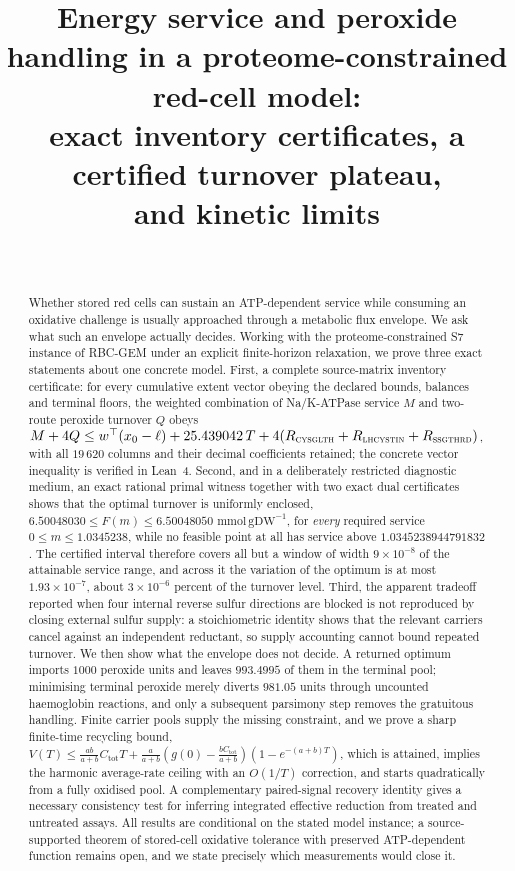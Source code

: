 \documentclass[11pt,a4paper]{article}
\title{Energy service and peroxide handling in a proteome-constrained
red-cell model:\\ exact inventory certificates, a certified turnover plateau,\\
and kinetic limits}
\author{\PaperAuthor\\[2pt] {\small\itshape \PaperAffiliation}}
\date{\PaperDate}
\theoremstyle{plain}
\theoremstyle{definition}
\theoremstyle{remark}
\newcommand{\Ctot}{C_{\mathrm{tot}}}
\newcommand{\mmolg}{\mathrm{mmol}\,\mathrm{gDW}^{-1}}
\newcommand{\rx}[1]{\textnormal{\textsc{#1}}}
\begin{document}
\maketitle

\begin{abstract}
Whether stored red cells can sustain an ATP-dependent service while consuming
an oxidative challenge is usually approached through a metabolic flux envelope.
We ask what such an envelope actually decides. Working with the
proteome-constrained S7 instance of RBC-GEM under an explicit finite-horizon
relaxation, we prove three exact statements about one concrete model. First, a
complete source-matrix inventory certificate: for every cumulative extent
vector obeying the declared bounds, balances and terminal floors, the weighted
combination of Na/K-ATPase service $M$ and two-route peroxide turnover $Q$
obeys $M+4Q\le w^{\top}(x_0-\ell)+25.439042\,T+4(R_{\rx{cysglth}}+
R_{\rx{lhcystin}}+R_{\rx{ssgthrd}})$, with all $19\,620$ columns and their
decimal coefficients retained; the concrete vector inequality is verified in
Lean~4. Second, and in a deliberately restricted diagnostic medium, an exact
rational primal witness together with two exact dual certificates shows that
the optimal turnover is uniformly enclosed,
$6.50048030\le F(m)\le 6.50048050$ $\mmolg$, for \emph{every} required service
$0\le m\le 1.0345238$, while no feasible point at all has service above
$1.0345238944791832$. The certified interval therefore covers all but a window of width
$9\times10^{-8}$ of the attainable service range, and across it the variation of
the optimum is at most $1.93\times10^{-7}$, about $3\times10^{-6}$ percent of
the turnover level. Third, the apparent tradeoff reported when four internal reverse sulfur
directions are blocked is not reproduced by closing external sulfur supply: a
stoichiometric identity shows that the relevant carriers cancel against an
independent reductant, so supply accounting cannot bound repeated turnover.
We then show what the envelope does not decide. A returned optimum imports
$1000$ peroxide units and leaves $993.4995$ of them in the terminal pool;
minimising terminal peroxide merely diverts $981.05$ units through uncounted
haemoglobin reactions, and only a subsequent parsimony step removes the
gratuitous handling. Finite carrier pools supply the missing constraint, and we
prove a sharp finite-time recycling bound,
$V(T)\le\frac{ab}{a+b}\Ctot T+\frac{a}{a+b}(g(0)-\frac{b\Ctot}{a+b})
(1-e^{-(a+b)T})$, which is attained, implies the harmonic average-rate ceiling
with an $O(1/T)$ correction, and starts quadratically from a fully oxidised
pool. A complementary paired-signal recovery identity gives a necessary
consistency test for inferring integrated effective reduction from treated and
untreated assays. All results are conditional on the stated model instance;
a source-supported theorem of stored-cell oxidative tolerance with preserved
ATP-dependent function remains open, and we state precisely which measurements
would close it.
\end{abstract}
\end{document}
